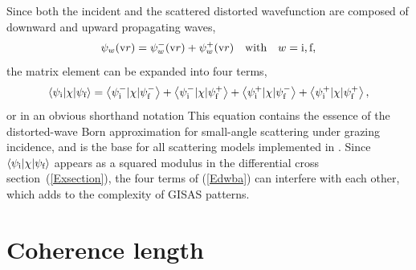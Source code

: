 Since both the incident
and the scattered distorted wavefunction
are composed of downward and upward propagating waves,
\begin{equation}\label{Epsipm}
  \psi_w(\text{v}{r})
  = \psi^-_w(\text{v}{r}) + \psi^+_w(\text{v}{r})
  \quad\text{with}\quad
  w=\text{i},\text{f},
\end{equation}
%
the matrix element can be expanded into four terms,
\begin{equation}\label{Edwba4}
  \left\langle \psi_{\text{i}}|\chi|\psi_{\text{f}}\right\rangle
  = \left\langle \psi^-_{\text{i}}|\chi|\psi^-_{\text{f}}\right\rangle
  + \left\langle \psi^-_{\text{i}}|\chi|\psi^+_{\text{f}}\right\rangle
  + \left\langle \psi^+_{\text{i}}|\chi|\psi^-_{\text{f}}\right\rangle
  + \left\langle \psi^+_{\text{i}}|\chi|\psi^+_{\text{f}}\right\rangle,
\end{equation}
%
%
or in an obvious shorthand notation
This equation contains the essence of
the distorted-wave Born approximation
for small-angle scattering under grazing incidence,
and is the base for all scattering models implemented in \BornAgain.
Since $\left\langle \psi_{\text{i}}|\chi|\psi_{\text{f}}\right\rangle$
appears as a squared modulus
in the differential cross section~(\ref{Exsection}),
the four terms of (\ref{Edwba}) can interfere with each other,
which adds to the complexity of GISAS patterns.

%


\iffalse
\section{Coherence length}\label{Scoherlen}

